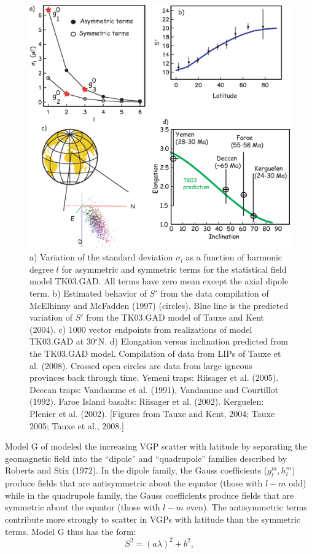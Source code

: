   \begin{figure}[htb]
\centering  \includegraphics[width=13.5 cm]{EPSfiles/tk03.eps}
\caption{a) Variation of the standard deviation $\sigma_l$ as a function of harmonic degree $l$ for asymmetric and symmetric terms for the statistical field model TK03.GAD.  All terms have zero mean except the axial dipole term.  b)  Estimated  behavior of $S'$ from  the data compilation of McElhinny and McFadden (1997) (circles).   Blue line is the predicted variation of $S'$ from the TK03.GAD model of Tauxe and Kent (2004).  c) 1000 vector endpoints from realizations of model TK03.GAD at 30$^{\circ}$N.   d)    Elongation versus inclination predicted from the TK03.GAD model.  Compilation of data from LIPs of Tauxe et al. (2008).   Crossed open circles are data from large igneous provinces  back through time.  Yemeni traps:  Riisager et al. (2005).   Deccan traps: Vandamme et al. (1991), Vandamme and Courtillot (1992).  Faroe Island basalts: Riisager et al. (2002).  Kerguelen:  Plenier et al. (2002). [Figures from Tauxe and Kent, 2004; Tauxe 2005; Tauxe et al., 2008.]}
\label{fig:tk03}
\end{figure}

\clearpage


Model G of \cite{mcfadden88} modeled the  increasing VGP scatter with latitude by separating the geomagnetic field into the ``dipole'' and ``quadrupole'' families described by \nocite{roberts72} Roberts and Stix (1972).  In the dipole family, the Gauss coefficients  ($g_l^m, h_l^m$)  produce fields that are antisymmetric about the equator (those with $l-m$ odd) while in the quadrupole family, the Gauss coefficients  produce fields that  are symmetric about the equator (those with $l-m$ even).      The antisymmetric terms contribute more strongly to  scatter in VGPs with  latitude than the symmetric terms.   Model G thus has the form:
\begin{equation}
S^2 = (a\lambda)^2 + b^2,
\label{eq:modelG}
\end{equation}



